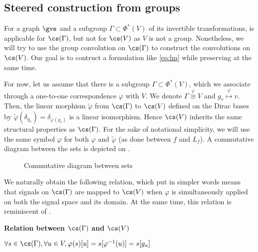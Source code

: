\subsection{Steered construction from groups}

For a graph $\gve$ and a subgroup $\Gamma \subset \Phi^*(V)$ of its invertible transformations,  is applicable for $\cs(\Gamma)$, but not for $\cs(V)$ as $V$ is not a group. Nonetheless, we will try to use the group convolution on $\cs(\Gamma)$ to construct the convolutions on $\cs(V)$. Our goal is to contruct a formulation like \eqref{eq:lm} while preserving  at the same time.

For now, let us assume that there is a subgroup $\Gamma \subset \Phi^*(V)$, which we associate through a one-to-one correspondence $\varphi$ with $V$. We denote $\Gamma \overset{\varphi}{\cong} V$ and $g_v \overset{\varphi}\mapsto v$. Then, the linear morphism $\widetilde\varphi$ from $\cs(\Gamma)$ to $\cs(V)$ defined on the Dirac bases by $\widetilde\varphi(\delta_{g_v}) = \delta_{\varphi(g_v)}$ is a linear isomorphism. Hence $\cs(V)$ inherits the same structural properties as $\cs(\Gamma)$. For the sake of notational simplicity, we will use the same symbol $\varphi$ for both $\varphi$ and $\widetilde\varphi$ (as done between $f$ and $L_f$). A commutative diagram between the sets is depicted on .

\begin{figure}[H]
\centering
{}%
\caption{Commutative diagram between sets}
\label{fig:iso}
\end{figure}

We naturally obtain the following relation, which put in simpler words means that signals on $\cs(\Gamma)$ are mapped to $\cs(V)$ when $\varphi$ is simultaneously applied on both the signal space and its domain. At the same time, this relation is reminiscent of .

\begin{lemma}\textbf{Relation between $\cs(\Gamma)$ and $\cs(V)$}\\
\centerline{$\forall s \in \cs(\Gamma), \forall u \in V, \varphi(s)[u] = s[\varphi^{-1}(u)] = s[g_u]$}
\label{lem:outer}
\end{lemma}

